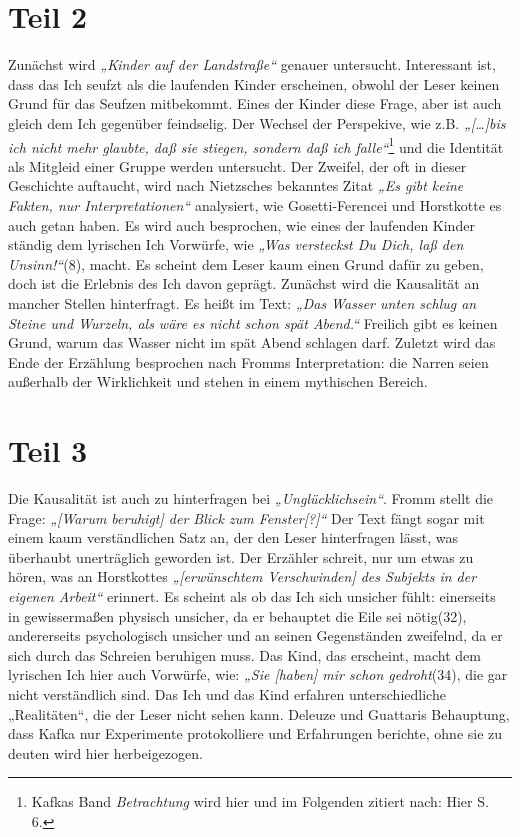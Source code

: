 \documentclass[12pt,a4paper]{article}
\begin{document}
\section{Teil 2}
Zunächst wird \textit{„Kinder auf der Landstraße“} genauer untersucht. Interessant ist, dass das Ich seufzt als die laufenden Kinder erscheinen, obwohl der Leser keinen Grund für das Seufzen mitbekommt. Eines der Kinder diese Frage, aber ist auch gleich dem Ich gegenüber feindselig. Der Wechsel der Perspekive, wie z.B. \textit{„[…]bis ich nicht mehr glaubte, daß sie stiegen, sondern daß ich falle“}\footnote{Kafkas Band \textit{Betrachtung} wird hier und im Folgenden zitiert nach: \cite{kafka} Hier S. 6.} und die Identität als Mitgleid einer Gruppe werden untersucht. Der Zweifel, der oft in dieser Geschichte auftaucht, wird nach Nietzsches bekanntes Zitat \textit{„Es gibt keine Fakten, nur Interpretationen“} analysiert, wie Gosetti-Ferencei\autocite[22]{gosetti2021} und Horstkotte\autocite[137]{horstkotte2014} es auch getan haben. Es wird auch besprochen, wie eines der laufenden Kinder ständig dem lyrischen Ich Vorwürfe, wie \textit{„Was versteckst Du Dich, laß den Unsinn!“}(8), macht. Es scheint dem Leser kaum einen Grund dafür zu geben, doch ist die Erlebnis des Ich davon geprägt. Zunächst wird die Kausalität an mancher Stellen hinterfragt. Es heißt im Text: \textit{„Das Wasser unten schlug an Steine und Wurzeln, als wäre es nicht schon spät Abend.“} Freilich gibt es keinen Grund, warum das Wasser nicht im spät Abend schlagen darf. Zuletzt wird das Ende der Erzählung besprochen nach Fromms\autocite[113]{fromm} Interpretation: die Narren seien außerhalb der Wirklichkeit und stehen in einem mythischen Bereich.

\section{Teil 3}
Die Kausalität ist auch zu hinterfragen bei \textit{„Unglücklichsein“}. Fromm stellt die Frage: \textit{„[Warum beruhigt] der Blick zum Fenster[?]“}\autocite[111]{fromm} Der Text fängt sogar mit einem kaum verständlichen Satz an, der den Leser hinterfragen lässt, was überhaubt unerträglich geworden ist. Der Erzähler schreit, nur um etwas zu hören, was an Horstkottes \textit{„[erwünschtem Verschwinden] des Subjekts in der eigenen Arbeit“}\autocite[122]{horstkotte2014} erinnert. Es scheint als ob das Ich sich unsicher fühlt: einerseits in gewissermaßen physisch unsicher, da er behauptet die Eile sei nötig(32), andererseits psychologisch unsicher und an seinen Gegenständen zweifelnd, da er sich durch das Schreien beruhigen muss. Das Kind, das erscheint, macht dem lyrischen Ich hier auch Vorwürfe, wie: \textit{„Sie [haben] mir schon gedroht}(34), die gar nicht verständlich sind. Das Ich und das Kind erfahren unterschiedliche „Realitäten“, die der Leser nicht sehen kann. Deleuze und Guattaris Behauptung, dass Kafka nur Experimente protokolliere und Erfahrungen berichte, ohne sie zu deuten\autocite[12]{deleuze2012} wird hier herbeigezogen.
\end{document}
